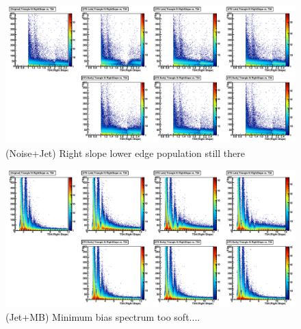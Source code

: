 \begin{figure}
   \includegraphics[width=120mm]{DailyLog/6411/6411_MixNoiseOnJetRightSlopeZoomIn.pdf}
   \caption{(Noise+Jet)  Right slope lower edge population still there}
   \label{Figure_6411_MixNoiseOnJetRightSlopeZoomIn}
\end{figure}

\begin{figure}
   \includegraphics[width=120mm]{DailyLog/6411/6411_MixJetOnMBRightSlope}
   \caption{(Jet+MB) Minimum bias spectrum too soft....}
   \label{Figure_6411_MixJetOnMBRightSlope}
\end{figure}

